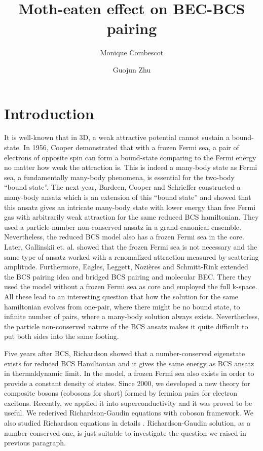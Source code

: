 \documentclass{article}
\author{Monique Combescot \and Guojun Zhu}
\title{Moth-eaten effect on BEC-BCS pairing}
\begin{document}
\maketitle
{}
\section{Introduction}
It is well-known that in 3D, a weak attractive potential cannot sustain a bound-state.  In 1956, Cooper demonstrated that with a frozen Fermi sea, a pair of electrons of opposite spin can form a bound-state comparing to the Fermi energy no matter how weak the attraction is\cite{Cooper}.  This is indeed a many-body state as Fermi sea, a fundamentally many-body phenomena,  is essential for the two-body ``bound state''.   The next year, Bardeen, Cooper and Schrieffer constructed a many-body ansatz which is an extension of this ``bound state'' and showed that this ansatz gives an intricate many-body state with lower energy than free Fermi gas with arbitrarily weak attraction\cite{BCS} for the same reduced BCS hamiltonian.  They used a particle-number non-conserved ansatz in a grand-canonical ensemble.  Nevertheless, the reduced BCS model also has a frozen Fermi sea in the core. Later,   Gallinskii et. al. showed that the frozen Fermi sea is not necessary and the same type of ansatz worked with a renomalized attraction measured by scattering amplitude\cite{}.   Furthermore, Eagles\cite{Eagles}, Leggett\cite{LeggettCrossover}, Nozi\`{e}res and Schmitt-Rink\cite{Nozieres} extended the BCS pairing idea and bridged BCS pairing and molecular BEC. There they used the model without a frozen Fermi sea as core and employed the full k-space.  All these lead to an interesting question that how the solution for the same hamiltonian evolves from one-pair, where there might be no bound state, to infinite number of pairs, where a many-body solution always exists.  Nevertherless, the particle non-conserved nature of the BCS ansatz makes it quite difficult to put both sides into the same footing.  

Five years after BCS, Richardson showed that a number-conserved eigenstate exists for reduced BCS Hamiltonian and it gives the same energy as BCS ansatz in thermaldynamic limit\cite{Richardson1,Richarson2,Richardson3,Richardson1968,gaudin}.  In the model, a frozen Fermi sea also exists in order to provide a constant density of states.  Since 2000, we developed a new theory for composite bosons (cobosons for short) formed by fermion pairs\cite{CobosonPhysicsReports} for electron excitons.   Recently, we applied it into superconductivity and it was proved to be useful.  We rederived Richardson-Gaudin equations with coboson framework\cite{CobosonBcsRich}. We also studied Richardson equations in details \cite{CombescotCooper,twoCooperPair}.  Richardson-Gaudin solution, as a number-conserved one, is just suitable to investigate the question we raised in previous paragraph.  
\end{document}
